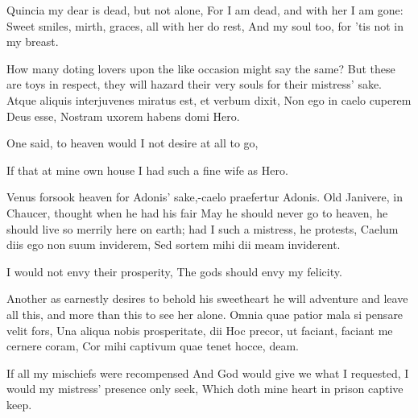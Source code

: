 {Quincia my dear is dead, but not alone,
For I am dead, and with her I am gone:
Sweet smiles, mirth, graces, all with her do rest,
And my soul too, for 'tis not in my breast.

How many doting lovers upon the like occasion might say the same? But
these are toys in respect, they will hazard their very souls for their
mistress' sake.
Atque aliquis interjuvenes miratus est, et verbum dixit,
Non ego in caelo cuperem Deus esse,
Nostram uxorem habens domi Hero.


One said, to heaven would I not
desire at all to go,

If that at mine own house I had
such a fine wife as Hero.

Venus forsook heaven for Adonis' sake,-caelo praefertur Adonis.
Old Janivere, in Chaucer, thought when he had his fair May he should
never go to heaven, he should live so merrily here on earth; had I such
a mistress, he protests,
Caelum diis ego non suum inviderem,
Sed sortem mihi dii meam inviderent.

I would not envy their prosperity,
The gods should envy my felicity.

Another as earnestly desires to behold his sweetheart he will adventure
and leave all this, and more than this to see her alone.
Omnia quae patior mala si pensare velit fors,
Una aliqua nobis prosperitate, dii
Hoc precor, ut faciant, faciant me cernere coram,
Cor mihi captivum quae tenet hocce, deam.

If all my mischiefs were recompensed
And God would give we what I requested,
I would my mistress' presence only seek,
Which doth mine heart in prison captive keep.

}
